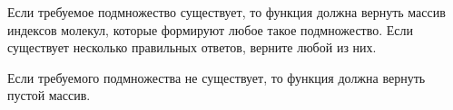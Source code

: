 Если требуемое подмножество существует, то функция должна вернуть массив индексов молекул, которые формируют любое такое подмножество. Если существует несколько правильных ответов, верните любой из них.

Если требуемого подмножества не существует, то функция должна вернуть пустой массив.